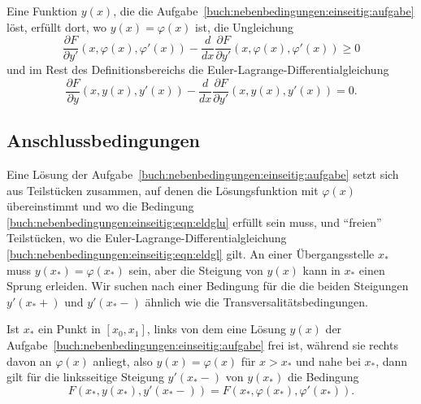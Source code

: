 \begin{satz}
\label{buch:nebenbedingungen:einseitig:satz:elungleichung}
Eine Funktion $y(x)$, die die
Aufgabe~\ref{buch:nebenbedingungen:einseitig:aufgabe}
löst, erfüllt dort, wo $y(x)=\varphi(x)$ ist, die Ungleichung
%
%
\begin{equation}
\frac{\partial F}{\partial y'}(x,\varphi(x),\varphi'(x))
-
\frac{d}{dx}\frac{\partial F}{\partial y'}(x,\varphi(x),\varphi'(x))
\ge
0
\label{buch:nebenbedingungen:einseitig:eqn:eldglu}
\end{equation}
und im Rest des Definitionsbereichs die Euler-Lagrange-Differentialgleichung
\begin{equation}
\frac{\partial F}{\partial y}(x,y(x),y'(x))
-
\frac{d}{dx}
\frac{\partial F}{\partial y'}(x,y(x),y'(x))
=
0.
\label{buch:nebenbedingungen:einseitig:eqn:eldgl}
\end{equation}
\end{satz}

%
%
\subsection{Anschlussbedingungen
\label{buch:nebenbedingungen:einseitig:subsection:anschluss}}

Eine Lösung der
Aufgabe~\ref{buch:nebenbedingungen:einseitig:aufgabe}
setzt sich aus Teilstücken zusammen, auf denen die Lösungsfunktion mit
$\varphi(x)$ übereinstimmt und wo die Bedingung
\eqref{buch:nebenbedingungen:einseitig:eqn:eldglu}
erfüllt sein muss, und ``freien'' Teilstücken, wo die
Euler-Lagrange-Differentialgleichung
\eqref{buch:nebenbedingungen:einseitig:eqn:eldgl} gilt.
An einer Übergangsstelle $x_*$ muss $y(x_*)=\varphi(x_*)$ sein,
aber die Steigung von $y(x)$ kann in $x_*$ einen Sprung
erleiden.
Wir suchen nach einer Bedingung für die die beiden Steigungen 
$y'(x_*+)$ und $y'(x_*-)$ ähnlich wie die Transversalitätsbedingungen.
%

\begin{satz}[Anschlussbedingungen]
\label{buch:nebenbedingungen:einseitig:satz:anschlussbedingungen}
Ist $x_*$ ein Punkt in $[x_0,x_1]$, links von dem eine Lösung $y(x)$ der
Aufgabe~\ref{buch:nebenbedingungen:einseitig:aufgabe}
frei ist, während sie rechts davon an $\varphi(x)$ anliegt, also
$y(x) = \varphi(x)$ für $x>x_*$ und nahe bei $x_*$, dann gilt
für die linksseitige Steigung $y'(x_*-)$ von $y(x_*)$ die
Bedingung
\[
F(x_*,y(x_*),y'(x_*-)) = F(x_*,\varphi(x_*),\varphi'(x_*)).
\]
\end{satz}

